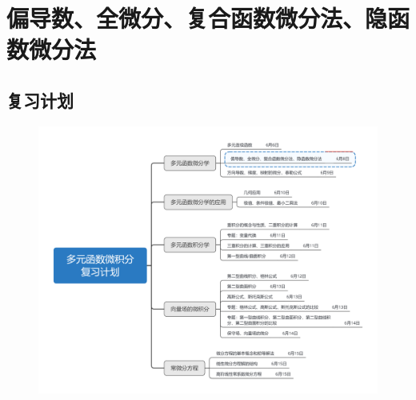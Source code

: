 \documentclass[12pt,UTF8]{ctexart}
\begin{document}
\setcounter{section}{1}
\section{偏导数、全微分、复合函数微分法、隐函数微分法}
\noindent
\subsection{复习计划}
\begin{figure}[H]
\begin{center}
\includegraphics[height=0.5\textheight]{Figures20190607/plan.png}
\end{center}
\end{figure}
\end{document}
